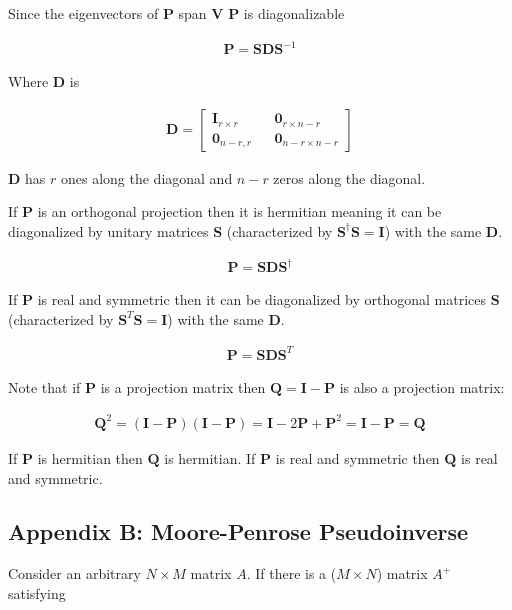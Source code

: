 \documentclass[12pt]{article}
\newcommand{\bv}[1]{\boldsymbol{#1}}
\begin{document}
Since the eigenvectors of $\bv{P}$ span $\bv{V}$ $\bv{P}$ is diagonalizable

\begin{align}
\bv{P} = \bv{S}\bv{D}\bv{S}^{-1}
\end{align}

Where $\bv{D}$ is 

\begin{align}
\bv{D} = 
\begin{bmatrix}
\bv{I}_{r\times r} && \bv{0}_{r\times n-r}\\
\bv{0}_{n-r, r} && \bv{0}_{n-r\times n-r}
\end{bmatrix}
\end{align}

$\bv{D}$ has $r$ ones along the diagonal and $n-r$ zeros along the diagonal.

If $\bv{P}$ is an orthogonal projection then it is hermitian meaning it can be diagonalized by unitary matrices $\bv{S}$ (characterized by $\bv{S}^{\dag}\bv{S}=\bv{I}$) with the same $\bv{D}$.

\begin{align}
\bv{P} = \bv{S}\bv{D}\bv{S}^{\dag}
\end{align}

If $\bv{P}$ is real and symmetric then it can be diagonalized by orthogonal matrices $\bv{S}$ (characterized by $\bv{S}^T\bv{S} = \bv{I}$) with the same $\bv{D}$.

\begin{align}
\bv{P} = \bv{S}\bv{D}\bv{S}^T
\end{align}

Note that if $\bv{P}$ is a projection matrix then $\bv{Q} = \bv{I}-\bv{P}$ is also a projection matrix:

\begin{align}
\bv{Q}^2 = (\bv{I}-\bv{P})(\bv{I}-\bv{P}) = \bv{I} - 2\bv{P} + \bv{P}^2 = \bv{I} - \bv{P} = \bv{Q}
\end{align}

If $\bv{P}$ is hermitian then $\bv{Q}$ is hermitian. If $\bv{P}$ is real and symmetric then $\bv{Q}$ is real and symmetric.

\subsection{Appendix B: Moore-Penrose Pseudoinverse}

Consider an arbitrary $N\times M$ matrix $A$. If there is a ($M\times N$) matrix $A^+$ satisfying
\end{document}
